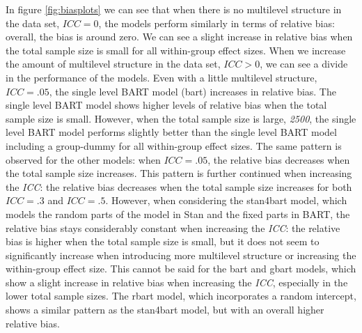 \documentclass[10pt, a4paper, titlepage]{article}
\begin{document}
In figure \ref{fig:biasplots} we can see that when there is no multilevel structure in the data set, $ICC = 0$, the models perform similarly in terms of relative bias: overall, the bias is around zero. We can see a slight increase in relative bias  when the total sample size is small for all within-group effect sizes.
When we increase the amount of multilevel structure in the data set, $ICC > 0$, we can see a divide in the performance of the models. Even with a little multilevel structure, $ICC = .05$, the single level BART model (bart) increases in relative bias. The single level BART model shows higher levels of relative bias when the total sample size is small. However, when the total sample size is large, \textit{2500}, the single level BART model performs slightly better than the single level BART model including a group-dummy for all within-group effect sizes. The same pattern is observed for the other models: when $ICC = .05$, the relative bias decreases when the total sample size increases.
This pattern is further continued when increasing the \textit{ICC}: the relative bias decreases when the total sample size increases for both $ICC = .3$ and $ICC = .5$. However, when considering the stan4bart model, which models the random parts of the model in Stan and the fixed parts in BART, the relative bias stays considerably constant when increasing the \textit{ICC}: the relative bias is higher when the total sample size is small, but it does not seem to significantly increase when introducing more multilevel structure or increasing the within-group effect size.
This cannot be said for the bart and gbart models, which show a slight increase in relative bias when increasing the \textit{ICC}, especially in the lower total sample sizes. The rbart model, which incorporates a random intercept, shows a similar pattern as the stan4bart model, but with an overall higher relative bias.
\end{document}
